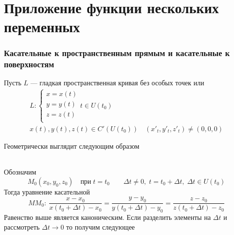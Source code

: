 \author{Andrei Tkachuk}
\part{Приложение функции нескольких переменных}
\section{Касательные к пространственным прямым и касательные к поверхностям}
		\begin{Def}
			Пусть $L$ --- гладкая пространственная кривая без особых точек или
			\begin{gather*}
				L : 
				\begin{cases}
					x = x(t) \\
					y = y(t) \\
					z = z(t) \\
				\end{cases} t \in U(t_0) \\ 
				x(t), y(t), z(t) \in C'(U(t_0)) \quad (x'_t, y'_t, z'_t) \neq (0, 0, 0) 
			\end{gather*}
		\end{Def}   
        Геометрически выглядит следующим образом
        \begin{figure}[bh]
            \noindent{}
        \end{figure}\\
        Обозначим
        \[
            	M_0(x_0, y_0, z_0) \quad \text{при}\; t = t_0 \qquad \Delta t \neq 0, \; t = t_0 + \Delta t, \; \Delta t \in  U(t_0)
        \]
        Тогда уравнение касательной
		\begin{equation*}
            MM_0 :\: \frac{x - x_0}{x (t_0 + \Delta t) - x_0} = \frac{y - y_0}{y (t_0 + \Delta t) - y_0} = \frac{z - z_0}{z (t_0 + \Delta t) - z_0}
		\end{equation*}
		Равенство выше является каноническим. Если разделить элементы на $\Delta t$ и рассмотреть $\Delta t \rightarrow 0$ то получим следующее
